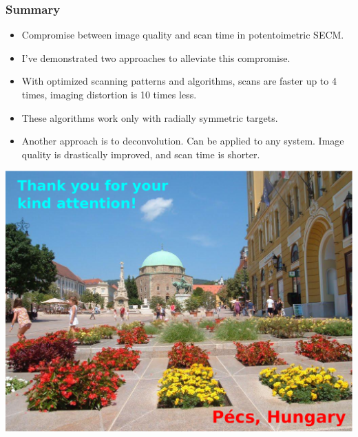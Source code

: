 \documentclass{beamer}
\begin{document}
\begin{frame}
	\frametitle{Summary}
\begin{itemize}
	\item Compromise between image quality and scan time in potentoimetric SECM.
	\item I've demonstrated two approaches to alleviate this compromise.
	\item With optimized scanning patterns and algorithms, scans are faster up to 4 times, imaging distortion is 10 times less.
	\item These algorithms work only with radially symmetric targets.
	\item Another approach is to deconvolution. Can be applied to any system. Image quality is drastically improved, and scan time is shorter.
\end{itemize}
\end{frame}







\begin{frame}
\includegraphics[width=1\textwidth]{pecs.eps}
\end{frame}
\end{document}
